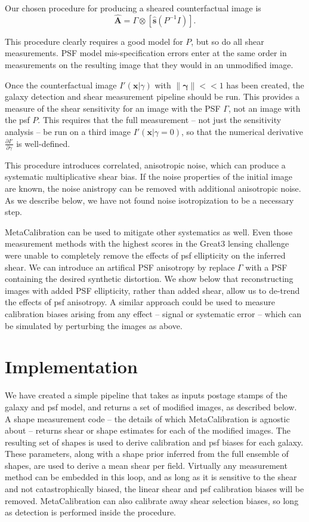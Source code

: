 \documentclass[iop]{emulateapj}
\begin{document}
Our chosen procedure for producing a sheared counterfactual image is
\begin{equation}
\hat{\mathbf{A}}  = \Gamma \otimes \left[ \hat{\mathbf{s}} \left(P^{-1} I \right)\right].
\end{equation}

This procedure clearly requires a good model for $P$, but so do all shear measurements. PSF model mis-specification errors enter at the same order in measurements on the resulting image that they would in an unmodified image.

Once the counterfactual image $I'(\mathbf{x}|\gamma)$ with $\|{\boldsymbol \gamma}\| << 1$ has been created, the galaxy detection and  shear measurement pipeline should be run. This provides a measure of the shear sensitivity for an image with the PSF $\Gamma$, not an image with the psf $P$. This requires that the full measurement -- not just the sensitivity analysis -- be run on a third image $I'(\mathbf{x}|\gamma=0)$, so that the numerical derivative $\frac{\partial I'}{\partial \gamma}$ is well-defined. 

This procedure introduces correlated, anisotropic noise, which can produce a systematic multiplicative shear bias. If the noise properties of the initial image are known, the noise anistropy can be removed with additional anisotropic noise. As we describe below, we have not found noise isotropization to be a necessary step.

MetaCalibration can be used to mitigate other systematics as well. Even those measurement methods with the highest scores in the Great3 lensing challenge were unable to completely remove the effects of psf ellipticity on the inferred shear. We can introduce an artifical PSF anisotropy by replace $\Gamma$ with a PSF containing the desired synthetic distortion.  We show below that reconstructing images with added PSF ellipticity, rather than added shear, allow us to de-trend the effects of psf anisotropy. A similar approach could be used to measure calibration biases arising from any effect -- signal or systematic error --  which can be simulated by perturbing the images as above.

\section{Implementation}
We have created a simple pipeline that takes as inputs postage stamps of the galaxy and psf model, and returns a set of modified images, as described below. A shape measurement code -- the details of which MetaCalibration is agnostic about -- returns shear or shape estimates for each of the modified images. The resulting set of shapes is used to derive calibration and psf biases for each galaxy. These parameters, along with a shape prior inferred from the full ensemble of shapes, are used to derive a mean shear per field. Virtually any measurement method can be embedded in this loop, and as long as it is sensitive to the shear and not catastrophically biased, the linear shear and psf calibration biases will be removed. MetaCalibration can also calibrate away shear selection biases, so long as detection is performed inside the procedure.
\end{document}
